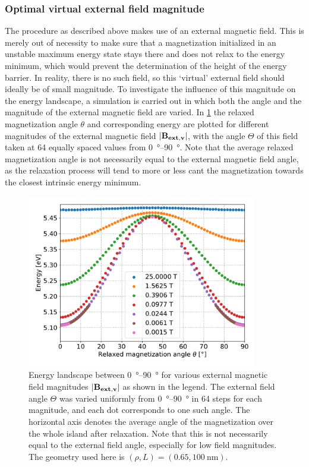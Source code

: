 \documentclass[11pt,a4paper,english]{article}
\begin{document}
\subsubsection{Optimal virtual external field magnitude}
The procedure as described above makes use of an external magnetic field. This is merely out of necessity to make sure that a magnetization initialized in an unstable maximum energy state stays there and does not relax to the energy minimum, which would prevent the determination of the height of the energy barrier. In reality, there is no such field, so this `virtual' external field should ideally be of small magnitude. To investigate the influence of this magnitude on the energy landscape, a simulation is carried out in which both the angle and the magnitude of the external magnetic field are varied. In \cref{fig:barrierLandscape-sweepBext} the relaxed magnetization angle $\theta$ and corresponding energy are plotted for different magnitudes of the external magnetic field $\abs{\vb{B_{ext,v}}}$, with the angle $\Theta$ of this field taken at 64 equally spaced values from \SIrange{0}{90}{\degree}. Note that the average relaxed magnetization angle is not necessarily equal to the external magnetic field angle, as the relaxation process will tend to more or less cant the magnetization towards the closest intrinsic energy minimum.
\begin{figure}
    \centering
    \includegraphics[width=0.9\textwidth]{Figures/biaxial_island/BarrierLandscape/Plus_65_B25-0.001-div4_a128Pi_plotOptimized.pdf}
    \caption{Energy landscape between \SIrange{0}{90}{\degree} for various external magnetic field magnitudes $\abs{\vb{B_{ext,v}}}$ as shown in the legend. The external field angle $\Theta$ was varied uniformly from \SIrange{0}{90}{\degree} in 64 steps for each magnitude, and each dot corresponds to one such angle. The horizontal axis denotes the average angle of the magnetization over the whole island after relaxation. Note that this is not necessarily equal to the external field angle, especially for low field magnitudes. The geometry used here is $(\rho, L)=(0.65, \SI{100}{\nano\metre})$.}
    \label{fig:barrierLandscape-sweepBext}
\end{figure}
\end{document}
